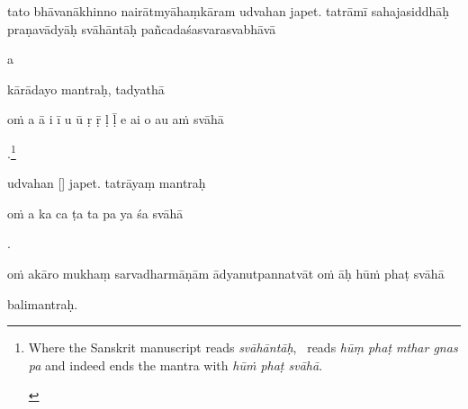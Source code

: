 \documentclass[naipra.tex]{subfiles}
\begin{document}
\begin{sanskrit}

\pstart
tato bhāvanākhinno nairātmyāhaṃkāram udvahan  japet.
tatrāmī sahajasiddhāḥ praṇavādyāḥ svāhāntāḥ pañcadaśasvarasvabhāvā \begin{mantra}a\end{mantra}\dsh kārādayo mantraḥ, tadyathā\Emdash \begin{mantra}oṁ a ā i ī u ū ṛ ṝ ḷ ḹ e ai o au aṁ svāhā\end{mantra}.\footnote{
	\begin{english}%
		Where the Sanskrit manuscript reads \emph{svāhāntāḥ}, \TIB\ reads \emph{hūṃ phaṭ mthar gnas pa} and indeed ends the mantra with \emph{hūṁ phaṭ svāhā}.
	\end{english}
}
\pend


\pstart
{} udvahan [] japet.
tatrāyaṃ mantraḥ\Emdash \begin{mantra}oṁ a ka ca ṭa ta pa ya śa svāhā\end{mantra}.
\pend


\pstart
\begin{mantra}oṁ akāro mukhaṃ sarvadharmāṇām ādyanutpannatvāt oṁ āḥ hūṁ phaṭ svāhā\end{mantra}\Emdash balimantraḥ. 
\pend



\end{sanskrit}
\end{document}
